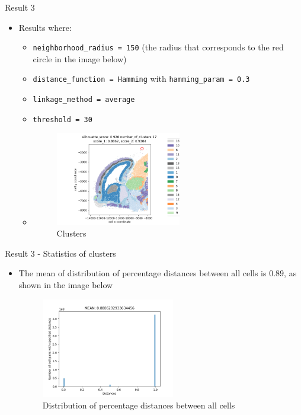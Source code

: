 \documentclass{beamer}
\begin{document}
\begin{frame}{Result 3}

\begin{itemize}
    \item<1->  Results where:
    \begin{itemize}
        \item<2->  \texttt{neighborhood\_radius = 150} (the radius that corresponds to the red circle in the image below)
        \item<3->  \texttt{distance\_function = Hamming} with \texttt{hamming\_param = 0.3}
        \item<4->  \texttt{linkage\_method = average}
        \item<5->  \texttt{threshold = 30}
        \item<6-> []
        \begin{figure}
   		 \includegraphics[width=0.55\textwidth]{clusters_5.png}
    		\caption{Clusters}
	\end{figure} 
    \end{itemize}
\end{itemize}

\end{frame}
\begin{frame}{Result 3 - Statistics of clusters}

\begin{itemize}
    \item<1-> The mean of distribution of percentage distances between all cells is $0.89$, as shown in the image below
    \begin{figure}
    \centering
    \includegraphics[width=0.55\textwidth]{all_distances5.png}
    \caption{Distribution of percentage distances between all cells}
\end{figure} 
   
\end{itemize}
\end{frame}
\end{document}
